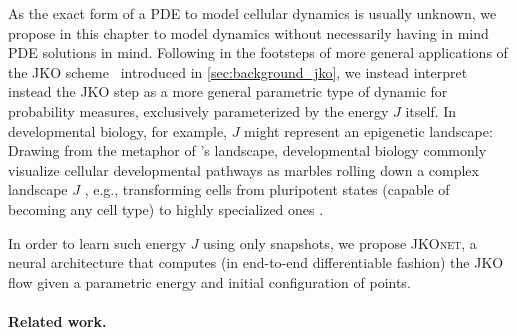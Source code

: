  As the exact form of a PDE to model cellular dynamics is usually unknown, we propose in this chapter to model dynamics without necessarily having in mind PDE solutions in mind.
Following in the footsteps of more general applications of the \acrlong{JKO} scheme~\citep[\S4.8]{santambrogio2017euclidean} introduced in \cref{sec:background_jko}, we instead interpret instead the \acrshort{JKO} step as a more general parametric type of dynamic for probability measures, exclusively parameterized by the energy $J$ itself.
In developmental biology, for example, $J$ might represent an epigenetic landscape: Drawing from the metaphor of \citeauthor{waddington1957strategy}'s landscape, developmental biology commonly visualize cellular developmental pathways as marbles rolling down a complex landscape $J$ \citep{waddington1957strategy}, e.g., transforming cells from pluripotent states (capable of becoming any cell type) to highly specialized ones \citep{schiebinger2021reconstructing}. 

In order to learn such energy $J$ using only snapshots, we propose \textsc{JKOnet}, a neural architecture that computes (in end-to-end differentiable fashion) the JKO flow given a parametric energy and initial configuration of points.


\paragraph{Related work.}

